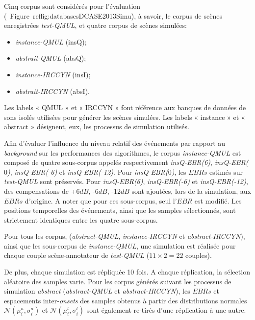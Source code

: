 Cinq corpus sont considérés pour l'évaluation (\cf~Figure~ref{fig:databasesDCASE2013Simu}), à savoir, le corpus de scènes enregistrées \emph{test-QMUL}, et quatre corpus de scènes simulées:

\begin{itemize}
\item \emph{instance-QMUL} (insQ);
\item \emph{abstrait-QMUL} (absQ);
\item \emph{instance-IRCCYN} (insI);
\item \emph{abstrait-IRCCYN} (absI).
\end{itemize}

Les labels « QMUL » et « IRCCYN » font référence aux banques de données de sons isolés utilisées pour générer les scènes simulées. Les labels « instance » et « abstract » désignent, eux, les processus de simulation utilisés. 

Afin d'évaluer l'influence du niveau relatif des événements par rapport au \emph{background} sur les performances des algorithmes, le corpus \emph{instance-QMUL} est composé de quatre sous-corpus appelés respectivement \emph{insQ-EBR(6)}, \emph{insQ-EBR($0$)}, \emph{insQ-EBR(-6)} et \emph{insQ-EBR(-12)}. Pour \emph{insQ-EBR($0$)}, les $EBRs$ estimés sur \emph{test-QMUL} sont préservés. Pour \emph{insQ-EBR(6)}, \emph{insQ-EBR(-6)} et \emph{insQ-EBR(-12)}, des compensations de +6$dB$, -6$dB$, -12$dB$ sont ajoutées, lors de la simulation, aux $EBRs$ d'origine. A noter que pour ces sous-corpus, seul l'$EBR$ est modifié. Les positions temporelles des événements, ainsi que les samples sélectionnés, sont strictement identiques entre les quatre sous-corpus.

Pour tous les corpus, (\emph{abstract-QMUL}, \emph{instance-IRCCYN} et \emph{abstract-IRCCYN}), ainsi que les sous-corpus de \emph{instance-QMUL}, une simulation est réalisée pour chaque couple scène-annotateur de \emph{test-QMUL} ($11\times2=22$ couples). 

De plus, chaque simulation est répliquée 10 fois. A chaque réplication, la sélection aléatoire des samples varie. Pour les corpus générés suivant les processus de simulation \emph{abstract} (\emph{abstract-QMUL} et \emph{abstract-IRCCYN}), les $EBRs$ et espacements inter-\emph{onsets} des samples obtenus à partir des distributions normales  $\mathcal{N}(\mu_i^a,\sigma_i^a)$ et $\mathcal{N}(\mu_i^t,\sigma_i^t)$ sont également re-tirés d'une réplication à une autre. 


